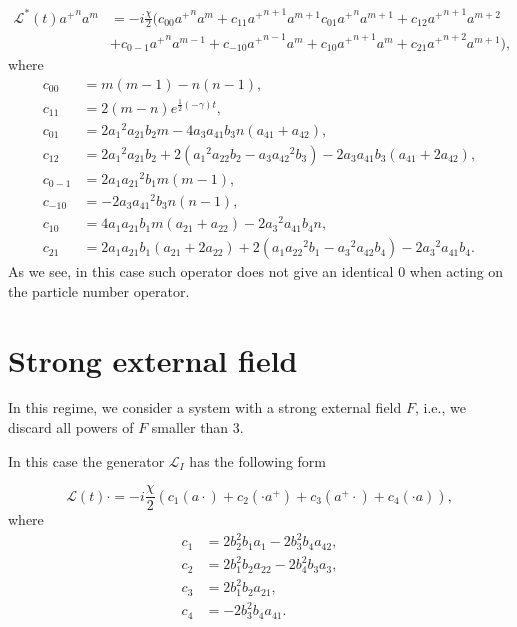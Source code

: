 \documentclass[12pt]{article}
\theoremstyle{definition}
\begin{document}
	\begin{align}
		\label{eq:ActOfGenOnExpr}
		\mathcal{L}^*(t){a^+}^na^m &= -i\frac{\chi}{2}(c_{00}{a^+}^na^m + c_{11}{a^+}^{n+1}a^{m+1} c_{01}{a^+}^na^{m + 1} + c_{12}{a^+}^{n + 1}a^{m + 2} \nonumber\\&+ c_{0-1}{a^+}^na^{m-1} + c_{-10}{a^+}^{n - 1}a^m + c_{10}{a^+}^{n+1}a^m + c_{21}{a^+}^{n+2}a^{m+1}),
	\end{align}
	where
	\begin{align*}
		c_{00} &= m (m-1)-n (n-1),\\
		c_{11} &= 2 (m-n) e^{\frac{1}{2} (-\gamma ) t},\\
		c_{01} &= 2 {a_1}^2 {a_{21}} {b_2} m-4 {a_3} {a_{41}} {b_3} n ({a_{41}}+{a_{42}}),\\
		c_{12} &= 2 {a_1}^2 {a_{21}} {b_2}+2 \left({a_1}^2 {a_{22}} {b_2}-{a_3} {a_{42}}^2 {b_3}\right)-2 {a_3} {a_{41}} {b_3} ({a_{41}}+2 {a_{42}}),\\
		c_{0-1} &= 2 {a_1} {a_{21}}^2 {b_1} m (m-1),\\
		c_{-10} &=-2 {a_3} {a_{41}}^2 {b_3} n (n-1),\\
		c_{10} &= 4 {a_1} {a_{21}} {b_1} m ({a_{21}}+{a_{22}})-2 {a_3}^2 {a_{41}} {b_4} n,\\
		c_{21} &= 2 {a_1} {a_{21}} {b_1} ({a_{21}}+2 {a_{22}})+2 \left({a_1} {a_{22}}^2 {b_1}-{a_3}^2 {a_{42}} {b_4}\right)-2 {a_3}^2 {a_41} {b_4}.
	\end{align*}
	As we see, in this case such operator does not give an identical 0 when acting on the particle number operator.
	

	\section{Strong external field}
	
	In this regime, we consider a system with a strong external field $F$, i.e., we discard all powers of $F$ smaller than 3.
	
	In this case the generator $\mathcal{L}_I$ has the following form

	\begin{equation*}
		\mathcal{L}(t)\cdot = -i\frac{\chi}{2}\left(  c_1(a\cdot) + c_2(\cdot{a}^+) + c_3({a}^+\cdot) + c_4(\cdot a) \right),
	\end{equation*}
	where
	\begin{align*}
		c_1 &= 2b_2^2b_1a_1 - 2b_3^2b_4a_{42},\\
		c_2 &= 2b_1^2b_2a_{22} - 2b_4^2b_3a_3,\\
		c_3 &= 2b_1^2b_2a_{21},\\
		c_4 &= -2b_3^2b_4a_{41}.
	\end{align*}
	
\end{document}
